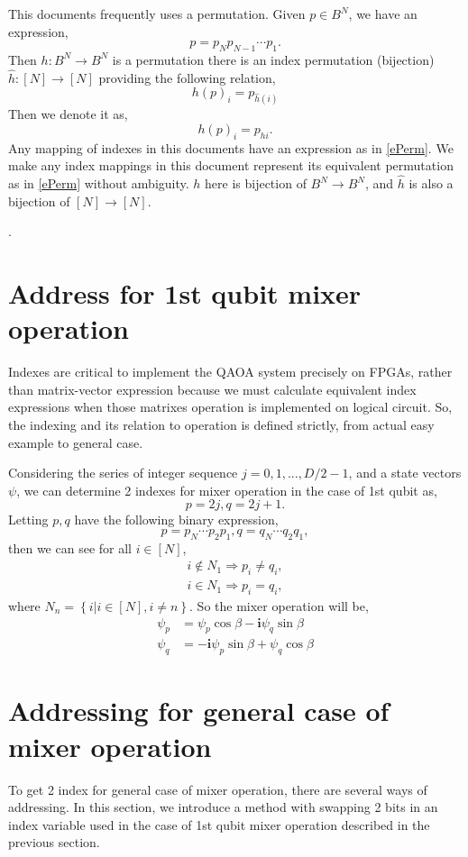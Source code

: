 \documentclass[a4paper]{article}
\newcommand{\eqlabel}[1]{\label{#1}}
\newcommand{\cbr}[1]{\left\{#1\right\}}
\newcommand{\ci}{\mathbf{i}}
\begin{document}
This documents frequently uses a permutation. Given \(p\in B^N\), we have an expression,
\[
p= p_Np_{N-1}\cdots p_1.
\]
Then \(h: B^N\to B^N\) is a permutation there is an index permutation (bijection) \(\hat{h}: [N]\to[N]\) providing the following relation, 
\begin{equation}
    \eqlabel{ePerm}
    h(p)_i =  p_{\hat{h}(i)}
\end{equation}
Then we denote it as,
\[
    h(p)_i = p_{h i}.
\]
Any mapping of indexes in this documents have an expression as in \eqref{ePerm}. We make any index mappings in this document represent its equivalent permutation as in \eqref{ePerm} without ambiguity. \(h\) here is bijection of \(B^N\to B^N\), and \(\hat{h}\) is also a bijection of \([N]\to [N]\).

.
\section{Address for 1st qubit mixer operation}
\label{s1stmixer}
Indexes are critical to implement the QAOA system precisely on FPGAs, rather than matrix-vector expression because we must calculate equivalent index expressions when those matrixes operation is implemented on logical circuit. So, the indexing and its relation to operation is defined strictly, from actual easy example to general case.

Considering the series of integer sequence \(j=0,1,...,D/2-1\), and a state vectors \(\psi\), we can determine 2 indexes for mixer operation in the case of 1st qubit as,
\begin{equation}
    \eqlabel{ei}
    p = 2 j, q = 2 j + 1.
\end{equation}
Letting \(p, q\) have the following binary expression,
\[
 p = p_N \cdots p_2 p_1, q = q_N \cdots q_2 q_1,
\]
then we can see for all \(i \in [N]\),
\[
\begin{matrix}
    i \not\in N_1\Rightarrow p_i \neq q_i,\\
    i\in N_1\Rightarrow p_i = q_i,
\end{matrix}
\]
where \(N_n = \cbr{i|i\in [N], i\neq n}\).
So the mixer operation will be,
\begin{align}
    \nonumber
    \psi_p &= \psi_p\cos\beta - \ci\psi_q \sin \beta \\
    \eqlabel{em}
    \psi_q &= -\ci\psi_p\sin \beta  + \psi_q\cos \beta
\end{align}
\section{Addressing for general case of mixer operation}
\label{sAddrGen}
To get 2 index for general case of mixer operation, there are several ways of addressing. In this section, we introduce a method with swapping 2 bits in an index variable used in the case of 1st qubit mixer operation described in the previous section.
\end{document}
